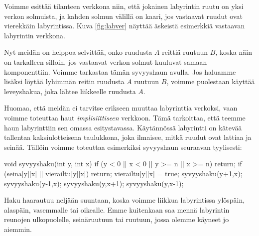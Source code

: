 Voimme esittää tilanteen verkkona niin,
että jokainen labyrintin ruutu on yksi verkon solmuista,
ja kahden solmun välillä on kaari,
jos vastaavat ruudut ovat vierekkäin labyrintissa.
Kuva \ref{fig:labver} näyttää äskeistä esimerkkiä vastaavan
labyrintin verkkona.

Nyt meidän on helppoa selvittää, onko ruudusta $A$ reittiä
ruutuun $B$, koska näin on tarkalleen silloin,
jos vastaavat verkon solmut kuuluvat samaan komponenttiin.
Voimme tarkastaa tämän syvyyshaun avulla.
Jos haluamme lisäksi löytää lyhimmän reitin ruudusta $A$
ruutuun $B$, voimme puolestaan käyttää leveyshakua,
joka lähtee liikkeelle ruudusta $A$.

Huomaa, että meidän ei tarvitse erikseen muuttaa labyrinttia
verkoksi, vaan voimme toteuttaa haut \emph{implisiittiseen} verkkoon.
Tämä tarkoittaa, että teemme haun labyrinttiin sen omassa
esitystavassa. Käytännössä labyrintti on kätevää tallentaa kaksiulotteisena
taulukkona, joka ilmaisee, mitkä ruudut ovat lattiaa ja seinää.
Tällöin voimme toteuttaa esimerkiksi syvyyshaun seuraavan tyylisesti:

\begin{code}
void syvyyshaku(int y, int x) {
    if (y < 0 || x < 0 || y >= n || x >= n) return;
    if (seina[y][x] || vierailtu[y][x]) return;
    vierailtu[y][x] = true;
    syvyyshaku(y+1,x);
    syvyyshaku(y-1,x);
    syvyyshaku(y,x+1);
    syvyyshaku(y,x-1);
}
\end{code}

Haku haarautuu neljään suuntaan, koska voimme liikkua labyrintissa
ylöspäin, alaspäin, vasemmalle tai oikealle.
Emme kuitenkaan saa mennä labyrintin reunojen ulkopuolelle,
seinäruutuun tai ruutuun, jossa olemme käyneet jo aiemmin.


